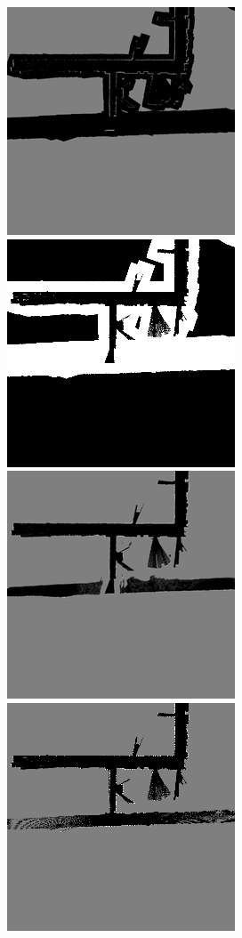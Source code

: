 \begin{figure}[h!]%
  \def\frac{0.24}
  \includegraphics[width=\frac\linewidth]{./files/media/department_diiga/00016_input.png}%
  \includegraphics[width=\frac\linewidth]{./files/media/department_diiga/00016_mask.png}%
  \includegraphics[width=\frac\linewidth]{./files/media/department_diiga/0016_output.png}%
  \includegraphics[width=\frac\linewidth]{./files/media/department_diiga/00016_estimated.png}%

\end{figure}
